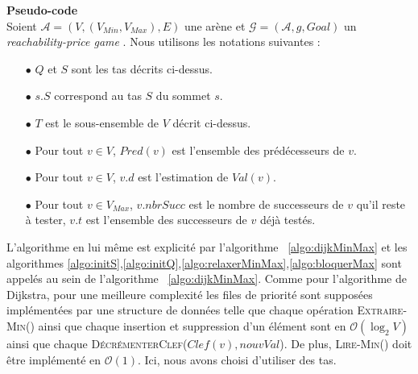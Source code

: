 \noindent \textbf{Pseudo-code}\\

Soient $\mathcal{A} = (V, (V_{Min}, V_{Max}), E) $ une arène et $\mathcal{G} = (\mathcal{A}, g, Goal)$ un \og \textit{reachability-price game} \fg. Nous utilisons les notations suivantes : 
\begin{enumerate} 
	\item[$\bullet$]$Q$ et $S$ sont les tas décrits ci-dessus.
	\item[$\bullet$]$s.S$  correspond au tas $S$ du sommet $s$.
	\item[$\bullet$]$T$ est le sous-ensemble de $V$ décrit ci-dessus.
	\item[$\bullet$]Pour tout $v \in V$, $Pred(v)$ est l'ensemble des prédécesseurs de $v$.
	\item[$\bullet$]Pour tout $v \in V$, $v.d$ est l'estimation de $Val(v)$.
	\item[$\bullet$]Pour tout $v \in V_{Max}$, $v.nbrSucc$ est le nombre de successeurs de $v$ qu'il reste à tester, $v.t$ est l'ensemble des successeurs de $v$ déjà testés.
\end{enumerate}

L'algorithme en lui même est explicité par l'algorithme ~\ref{algo:dijkMinMax} et les algorithmes \ref{algo:initS},\ref{algo:initQ},\ref{algo:relaxerMinMax},\ref{algo:bloquerMax} sont appelés au sein de l'algorithme ~\ref{algo:dijkMinMax}.
Comme pour l'algorithme de Dijkstra, pour une meilleure complexité les files de priorité sont supposées implémentées par une structure de données telle que chaque opération \textsc{Extraire-Min}() ainsi que chaque insertion et suppression d'un élément sont en $\mathcal{O}(\log_2 V)$ ainsi que chaque \textsc{DécrémenterClef}($Clef(v),nouvVal$). De plus, \textsc{Lire-Min()} doit être implémenté en $\mathcal{O}(1)$. Ici, nous avons choisi d'utiliser des tas. \\ 


